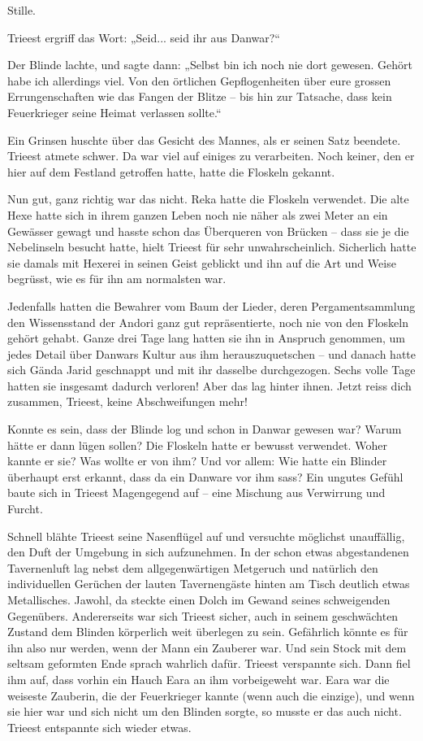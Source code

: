 Stille.

Trieest ergriff das Wort: „Seid... seid ihr aus Danwar?“

Der Blinde lachte, und sagte dann: „Selbst bin ich noch nie dort gewesen. Gehört habe ich allerdings viel. Von den örtlichen Gepflogenheiten über eure grossen Errungenschaften wie das Fangen der Blitze – bis hin zur Tatsache, dass kein Feuerkrieger seine Heimat verlassen sollte.“

Ein Grinsen huschte über das Gesicht des Mannes, als er seinen Satz beendete. Trieest atmete schwer. Da war viel auf einiges zu verarbeiten. Noch keiner, den er hier auf dem Festland getroffen hatte, hatte die Floskeln gekannt.

Nun gut, ganz richtig war das nicht. Reka hatte die Floskeln verwendet. Die alte Hexe hatte sich in ihrem ganzen Leben noch nie näher als zwei Meter an ein Gewässer gewagt und hasste schon das Überqueren von Brücken – dass sie je die Nebelinseln besucht hatte, hielt Trieest für sehr unwahrscheinlich. Sicherlich hatte sie damals mit Hexerei in seinen Geist geblickt und ihn auf die Art und Weise begrüsst, wie es für ihn am normalsten war.

Jedenfalls hatten die Bewahrer vom Baum der Lieder, deren Pergamentsammlung den Wissensstand der Andori ganz gut repräsentierte, noch nie von den Floskeln gehört gehabt. Ganze drei Tage lang hatten sie ihn in Anspruch genommen, um jedes Detail über Danwars Kultur aus ihm herauszuquetschen – und danach hatte sich Gända Jarid geschnappt und mit ihr dasselbe durchgezogen. Sechs volle Tage hatten sie insgesamt dadurch verloren! Aber das lag hinter ihnen. Jetzt reiss dich zusammen, Trieest, keine Abschweifungen mehr!

Konnte es sein, dass der Blinde log und schon in Danwar gewesen war? Warum hätte er dann lügen sollen? Die Floskeln hatte er bewusst verwendet. Woher kannte er sie? Was wollte er von ihm? Und vor allem: Wie hatte ein Blinder überhaupt erst erkannt, dass da ein Danware vor ihm sass? Ein ungutes Gefühl baute sich in Trieest Magengegend auf – eine Mischung aus Verwirrung und Furcht.

Schnell blähte Trieest seine Nasenflügel auf und versuchte möglichst unauffällig, den Duft der Umgebung in sich aufzunehmen. In der schon etwas abgestandenen Tavernenluft lag nebst dem allgegenwärtigen Metgeruch und natürlich den individuellen Gerüchen der lauten Tavernengäste hinten am Tisch deutlich etwas Metallisches. Jawohl, da steckte einen Dolch im Gewand seines schweigenden Gegenübers. Andererseits war sich Trieest sicher, auch in seinem geschwächten Zustand dem Blinden körperlich weit überlegen zu sein. Gefährlich könnte es für ihn also nur werden, wenn der Mann ein Zauberer war. Und sein Stock mit dem seltsam geformten Ende sprach wahrlich dafür. Trieest verspannte sich. Dann fiel ihm auf, dass vorhin ein Hauch Eara an ihm vorbeigeweht war. Eara war die weiseste Zauberin, die der Feuerkrieger kannte (wenn auch die einzige), und wenn sie hier war und sich nicht um den Blinden sorgte, so musste er das auch nicht. Trieest entspannte sich wieder etwas.

